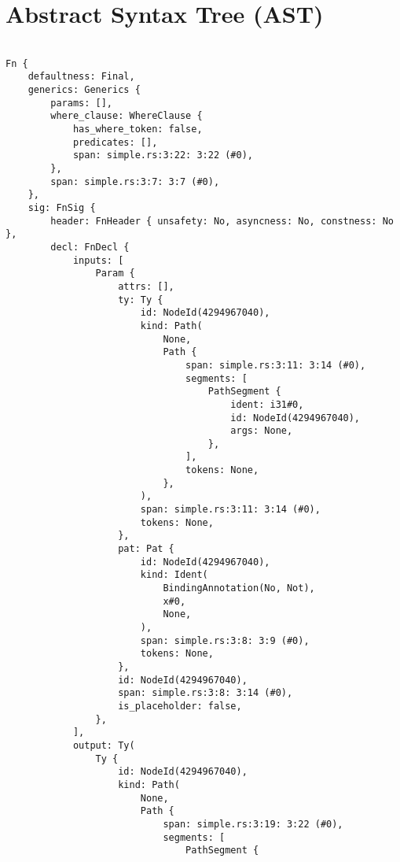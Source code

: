 \documentclass[
  11pt,
  twoside,symmetric]{report}
\begin{document}
\clearpage

\hypertarget{abstract-syntax-tree-ast}{%
\section{Abstract Syntax Tree (AST)}\label{abstract-syntax-tree-ast}}

\begin{verbatim}

Fn {
    defaultness: Final,
    generics: Generics {
        params: [],
        where_clause: WhereClause {
            has_where_token: false,
            predicates: [],
            span: simple.rs:3:22: 3:22 (#0),
        },
        span: simple.rs:3:7: 3:7 (#0),
    },
    sig: FnSig {
        header: FnHeader { unsafety: No, asyncness: No, constness: No },
        decl: FnDecl {
            inputs: [
                Param {
                    attrs: [],
                    ty: Ty {
                        id: NodeId(4294967040),
                        kind: Path(
                            None,
                            Path {
                                span: simple.rs:3:11: 3:14 (#0),
                                segments: [
                                    PathSegment {
                                        ident: i31#0,
                                        id: NodeId(4294967040),
                                        args: None,
                                    },
                                ],
                                tokens: None,
                            },
                        ),
                        span: simple.rs:3:11: 3:14 (#0),
                        tokens: None,
                    },
                    pat: Pat {
                        id: NodeId(4294967040),
                        kind: Ident(
                            BindingAnnotation(No, Not),
                            x#0,
                            None,
                        ),
                        span: simple.rs:3:8: 3:9 (#0),
                        tokens: None,
                    },
                    id: NodeId(4294967040),
                    span: simple.rs:3:8: 3:14 (#0),
                    is_placeholder: false,
                },
            ],
            output: Ty(
                Ty {
                    id: NodeId(4294967040),
                    kind: Path(
                        None,
                        Path {
                            span: simple.rs:3:19: 3:22 (#0),
                            segments: [
                                PathSegment {

\end{verbatim}
\end{document}
